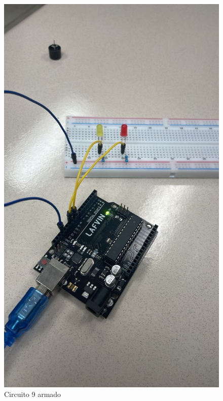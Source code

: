 \begin{figure}[H]
  \centering
  \includegraphics[scale = 0.3]{Imagenes/circDesarrollados/cd_9_circuito.jpg}
  \caption{Circuito 9 armado}
\end{figure}

